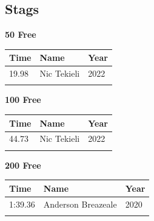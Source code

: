 \subsection{Stags}
\vspace{1.2em}
\noindent\begin{minipage}[t]{0.48\textwidth}
\centering
\textbf{\textcolor{teamprimary}{50 Free}}\par
\vspace{0.5em}
\centering
\small
\renewcommand{\arraystretch}{1.0}
\setlength{\tabcolsep}{4pt}
\begin{tabular}{@{}p{1.8cm}p{3.0cm}p{1.0cm}@{}}
\toprule
\textbf{Time} & \textbf{Name} & \textbf{Year} \\
\midrule
19.98 & Nic Tekieli & 2022 \\
\bottomrule
\vspace{0.5em}
\end{tabular}
\end{minipage}
\hfill
\begin{minipage}[t]{0.48\textwidth}
\centering
\textbf{\textcolor{teamprimary}{100 Free}}\par
\vspace{0.5em}
\centering
\small
\renewcommand{\arraystretch}{1.0}
\setlength{\tabcolsep}{4pt}
\begin{tabular}{@{}p{1.8cm}p{3.0cm}p{1.0cm}@{}}
\toprule
\textbf{Time} & \textbf{Name} & \textbf{Year} \\
\midrule
44.73 & Nic Tekieli & 2022 \\
\bottomrule
\vspace{0.5em}
\end{tabular}
\end{minipage}
\vspace{0.3em}
\vspace{1.2em}
\noindent\begin{minipage}[t]{0.48\textwidth}
\centering
\textbf{\textcolor{teamprimary}{200 Free}}\par
\vspace{0.5em}
\centering
\small
\renewcommand{\arraystretch}{1.0}
\setlength{\tabcolsep}{4pt}
\begin{tabular}{@{}p{1.8cm}p{3.0cm}p{1.0cm}@{}}
\toprule
\textbf{Time} & \textbf{Name} & \textbf{Year} \\
\midrule
1:39.36 & Anderson Breazeale & 2020 \\
\bottomrule
\vspace{0.5em}
\end{tabular}
\end{minipage}
